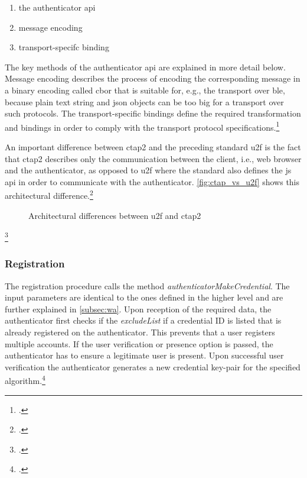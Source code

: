 \begin{enumerate}
	\item the authenticator \gls{api}
	\item message encoding
	\item transport-specifc binding
\end{enumerate}

The key methods of the authenticator \gls{api} are explained in more detail below. Message encoding describes the process of encoding the corresponding message in a binary encoding called \gls{cbor} that is suitable for, e.g., the transport over \gls{ble}, because plain text string and \gls{json} objects can be too big for a transport over such protocols. The transport-specific bindings define the required transformation and bindings in order to comply with the transport protocol specifications.\footcites[See][4--5]{ctap2}

An important difference between \gls{ctap}2 and the preceding standard \gls{u2f} is the fact that \gls{ctap}2 describes only the communication between the client, i.e., web browser and the authenticator, as opposed to \gls{u2f} where the standard also defines the \gls{js} \gls{api} in order to communicate with the authenticator. \autoref{fig:ctap_vs_u2f} shows this architectural difference.\footcites[See][51]{kim-new-way-fido}[See][254]{Schwartz2018}

\begin{figure}[hbt]
	\centering
	
	\caption[Architectural differences between \gls{u2f} and \gls{ctap}2]{Architectural differences between \gls{u2f} and \gls{ctap}2\footnotemark}
	\label{fig:ctap_vs_u2f}
\end{figure}
\footcitetexts[Source: diagram by author, based on][4]{u2f-overview}[][Chapter 6]{w3c}

\subsubsection{Registration}

The registration procedure calls the method \textit{authenticatorMakeCredential}. The input parameters are identical to the ones defined in the higher level \wa{} and are further explained in \autoref{subsec:wa}. Upon reception of the required data, the authenticator first checks if the \textit{excludeList} if a credential ID is listed that is already registered on the authenticator. This prevents that a user registers multiple accounts. If the user verification or presence option is passed, the authenticator has to ensure a legitimate user is present. Upon successful user verification the authenticator generates a new credential key-pair for the specified algorithm.\footcites[See][9]{ctap2}

